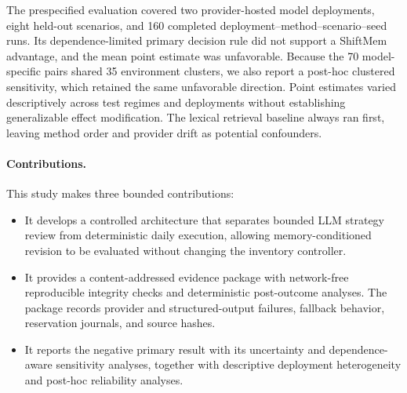 The prespecified evaluation covered two provider-hosted model deployments,
eight held-out scenarios, and 160 completed
deployment--method--scenario--seed runs. Its dependence-limited primary
decision rule did not support a ShiftMem advantage, and the mean point estimate
was unfavorable. Because the 70 model-specific pairs shared 35 environment
clusters, we also report a post-hoc clustered sensitivity, which retained the
same unfavorable direction. Point estimates varied descriptively across test
regimes and deployments without establishing generalizable effect modification.
The lexical retrieval baseline always ran first, leaving method order and provider
drift as potential confounders.

\paragraph{Contributions.}
This study makes three bounded contributions:
\begin{itemize}
  \item It develops a controlled architecture that separates bounded LLM
  strategy review from deterministic daily execution, allowing memory-conditioned
  revision to be evaluated without changing the inventory controller.
  \item It provides a content-addressed evidence package with network-free
  reproducible integrity checks and deterministic post-outcome analyses. The package records
  provider and structured-output failures, fallback behavior, reservation
  journals, and source hashes.
  \item It reports the negative primary result with its uncertainty and
  dependence-aware sensitivity analyses, together with descriptive deployment
  heterogeneity and post-hoc reliability analyses.
\end{itemize}
